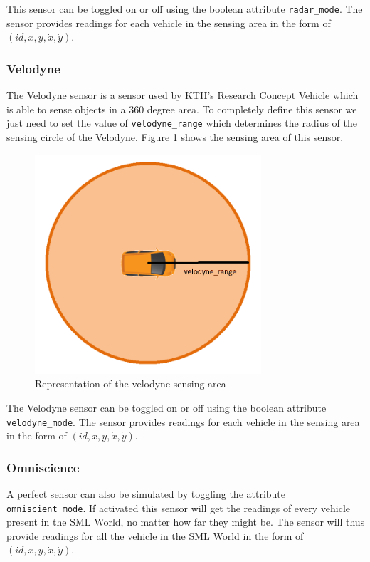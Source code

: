This sensor can be toggled on or off using the boolean attribute \texttt{radar\_mode}. The sensor provides readings for each vehicle in the sensing area in the form of $(id, x, y, \dot{x}, \dot{y})$.


\subsubsection{Velodyne}

The Velodyne sensor is a sensor used by KTH's Research Concept Vehicle which is able to sense objects in a 360 degree area. To completely define this sensor we just need to set the value of  \texttt{velodyne\_range} which determines the radius of the sensing circle of the Velodyne. Figure \ref{fig:velodyne_sensing_area} shows the sensing area of this sensor.

\begin{figure}[h!]
  \centering
    \includegraphics[width=0.75\textwidth]{velodyne_markings_quantities}
    \caption{Representation of the velodyne sensing area \label{fig:velodyne_sensing_area} }
\end{figure}

The Velodyne sensor can be toggled on or off using the boolean attribute \texttt{velodyne\_mode}. The sensor provides readings for each vehicle in the sensing area in the form of $(id, x, y, \dot{x}, \dot{y})$.

\subsubsection{Omniscience}

A perfect sensor can also be simulated by toggling the attribute \texttt{omniscient\_mode}. If activated this sensor will get the readings of every vehicle present in the SML World, no matter how far they might be. The sensor will thus provide readings for all the vehicle in the SML World in the form of $(id, x, y, \dot{x}, \dot{y})$.


